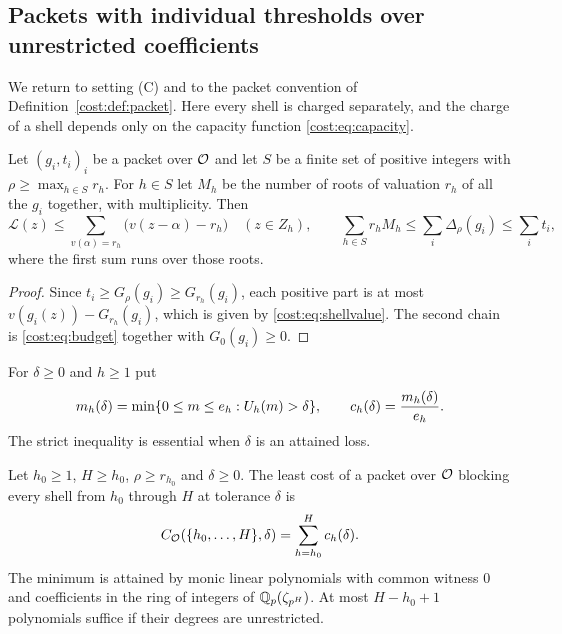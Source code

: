 \subsection{Packets with individual thresholds over unrestricted coefficients}\label{cost:sec:packet}
{\raggedright{}}

We return to setting (C) and to the packet convention of Definition~\ref{cost:def:packet}. Here every
shell is charged separately, and the charge of a shell depends only on the capacity
function \eqref{cost:eq:capacity}.

\begin{lemma}\label{cost:lem:charge}
Let $(g_i,t_i)_i$ be a packet over $\mathcal{O}$ and let $S$ be a finite set of positive integers
with $\rho\ge\max_{h\in S}r_h$. For $h\in S$ let $M_h$ be the number of roots of valuation
$r_h$ of all the $g_i$ together, with multiplicity. Then
\begin{equation}\label{cost:eq:charge}
 \mathcal L(z)\le\sum_{v(\alpha)=r_h}\bigl(v(z-\alpha)-r_h\bigr)\quad(z\in Z_h),\qquad
 \sum_{h\in S}r_hM_h\le\sum_i\Delta_\rho(g_i)\le\sum_it_i,
\end{equation}
where the first sum runs over those roots.
\end{lemma}

\begin{proof}
Since $t_i\ge G_\rho(g_i)\ge G_{r_h}(g_i)$, each positive part is at most
$v(g_i(z))-G_{r_h}(g_i)$, which is given by \eqref{cost:eq:shellvalue}. The second chain is
\eqref{cost:eq:budget} together with $G_0(g_i)\ge0$.
\end{proof}

For $\delta\ge0$ and $h\ge1$ put
\begin{equation}\label{cost:eq:shellcost}
 m_h(\delta)=\min\{0\le m\le e_h:U_h(m)>\delta\},\qquad c_h(\delta)=\frac{m_h(\delta)}{e_h}.
\end{equation}
The strict inequality is essential when $\delta$ is an attained loss.

\begin{theorem}\label{cost:thm:packet}
Let $h_0\ge1$, $H\ge h_0$, $\rho\ge r_{h_0}$ and $\delta\ge0$. The least cost of a packet
over $\mathcal{O}$ blocking every shell from $h_0$ through $H$ at tolerance $\delta$ is
\[
 C_{\mathcal{O}}(\{h_0,\ldots,H\},\delta)=\sum_{h=h_0}^Hc_h(\delta).
\]
The minimum is attained by monic linear polynomials with common witness $0$ and
coefficients in the ring of integers of $\mathbb{Q}_p(\zeta_{p^H})$. At most $H-h_0+1$ polynomials
suffice if their degrees are unrestricted.
\end{theorem}

